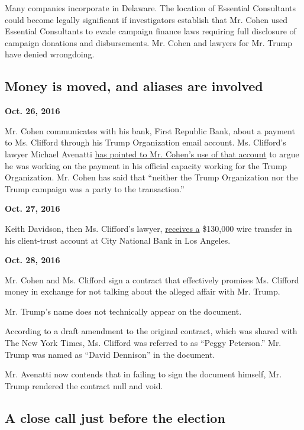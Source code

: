 Many companies incorporate in Delaware. The location of Essential
Consultants could become legally significant if investigators establish
that Mr. Cohen used Essential Consultants to evade campaign finance laws
requiring full disclosure of campaign donations and disbursements. Mr.
Cohen and lawyers for Mr. Trump have denied wrongdoing.

\hypertarget{money-is-moved-and-aliases-are-involved}{%
\subsection{Money is moved, and aliases are
involved}\label{money-is-moved-and-aliases-are-involved}}

\textbf{Oct. 26, 2016}

Mr. Cohen communicates with his bank, First Republic Bank, about a
payment to Ms. Clifford through his Trump Organization email account.
Ms. Clifford's lawyer Michael Avenatti
\href{https://www.nbcnews.com/news/us-news/michael-cohen-used-trump-org-email-stormy-daniels-arrangements-n855021}{has
pointed to Mr. Cohen's use of that account} to argue he was working on
the payment in his official capacity working for the Trump Organization.
Mr. Cohen has said that ``neither the Trump Organization nor the Trump
campaign was a party to the transaction.''

\textbf{Oct. 27, 2016}

Keith Davidson, then Ms. Clifford's lawyer,
\href{https://www.wsj.com/articles/trump-lawyers-payment-to-porn-star-was-reported-as-suspicious-by-bank-1520273701}{receives
a} \$130,000 wire transfer in his client-trust account at City National
Bank in Los Angeles.

\textbf{Oct. 28, 2016}

Mr. Cohen and Ms. Clifford sign a contract that effectively promises Ms.
Clifford money in exchange for not talking about the alleged affair with
Mr. Trump.

Mr. Trump's name does not technically appear on the document.

According to a draft amendment to the original contract, which was
shared with The New York Times, Ms. Clifford was referred to as ``Peggy
Peterson.'' Mr. Trump was named as ``David Dennison'' in the document.

Mr. Avenatti now contends that in failing to sign the document himself,
Mr. Trump rendered the contract null and void.

\hypertarget{a-close-call-just-before-the-election}{%
\subsection{A close call just before the
election}\label{a-close-call-just-before-the-election}}

